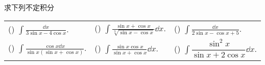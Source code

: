 \begin{example}
    求下列不定积分
    \setcounter{magicrownumbers}{0}
    \begin{table}[H]
        \centering
        \begin{tabular}{l | l | l}
            (\rownumber{}) $\displaystyle\int\frac{\dd x}{3\sin x-4\cos x}.$             & (\rownumber{}) $\displaystyle\int\frac{\sin x+\cos x}{\sqrt[3]{\sin x-\cos x}}\dd x.$ & (\rownumber{}) $\displaystyle\int\frac{\dd x}{2\sin x-\cos x+5}.$       \\
            (\rownumber{}) $\displaystyle\int\frac{\cos x\dd x}{\sin x(\sin x+\cos x)}.$ & (\rownumber{}) $\displaystyle\int\frac{\sin x\cos x}{\sin x+\cos x}\dd x.$            & (\rownumber{}) $\displaystyle\int\dfrac{\sin^2x}{\sin x+2\cos x}\dd x.$
        \end{tabular}
    \end{table}
\end{example}
